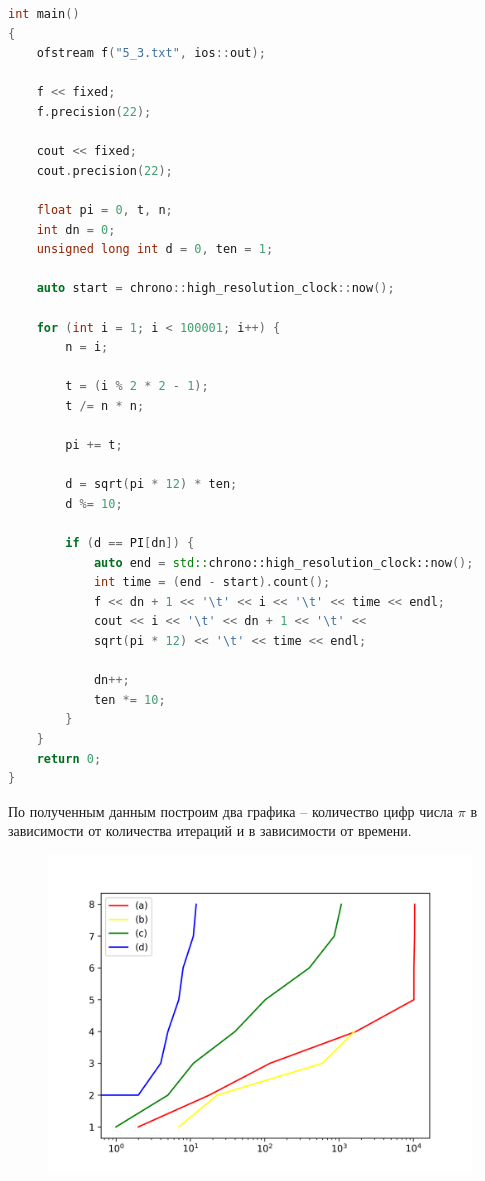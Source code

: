 \documentclass[14pt, a4paper]{article}
\begin{document}
\begin{enumerate}
\begin{lstlisting}[language=C++, basicstyle=\small]
int main()
{
	ofstream f("5_3.txt", ios::out);

	f << fixed;
	f.precision(22);

	cout << fixed;
	cout.precision(22);

	float pi = 0, t, n;
	int dn = 0;
	unsigned long int d = 0, ten = 1;

	auto start = chrono::high_resolution_clock::now();

	for (int i = 1; i < 100001; i++) {
		n = i;

		t = (i % 2 * 2 - 1);
		t /= n * n;

		pi += t;

		d = sqrt(pi * 12) * ten;
		d %= 10;

		if (d == PI[dn]) {
			auto end = std::chrono::high_resolution_clock::now();
			int time = (end - start).count();
			f << dn + 1 << '\t' << i << '\t' << time << endl;
			cout << i << '\t' << dn + 1 << '\t' <<
			sqrt(pi * 12) << '\t' << time << endl;

			dn++;
			ten *= 10;
		}
	}
	return 0;
}
\end{lstlisting}

По полученным данным построим два графика -- количество цифр числа $\pi$ в зависимости от количества итераций и в зависимости от времени.

\begin{figure}[h]
\centering
\includegraphics[scale=0.6]{infalaba1_5_1.png}
\label{image5_1}
\end{figure}


\end{enumerate}
\end{document}
